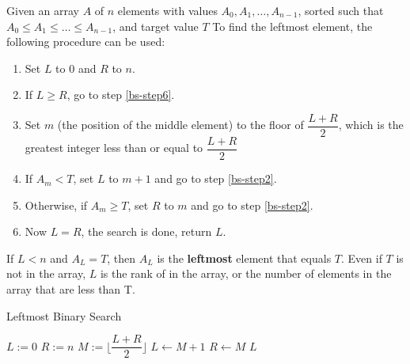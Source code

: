Given an array $A$ of $n$ elements with values $A_0, A_1, \ldots, A_{n-1}$, sorted such that $A_0 \leq A_1 \leq \ldots \leq A_{n-1}$, and target value $T$
To find the leftmost element, the following procedure can be used:
\begin{enumerate}
    \item Set $L$ to 0 and $R$ to $n$.
    \item If $L \geq R$, go to step \ref{bs-step6}. \label{bs-step2}
    \item Set $m$ (the position of the middle element) to the floor of $\dfrac{L + R}{2}$, which is the greatest integer less than or equal to $\dfrac{L + R}{2}$
    \item If $A_m < T$, set $L$ to $m + 1$ and go to step \ref{bs-step2}.
    \item Otherwise, if $A_m \geq T$, set $R$ to $m$ and go to step \ref{bs-step2}.
    \item Now $L = R$, the search is done, return $L$. \label{bs-step6}
\end{enumerate}
If $L < n$ and $A_L = T$, then $A_L$ is the \textbf{leftmost} element that equals $T$. Even if $T$ is not in the array, $L$ is the rank of in the array, or the number of elements in the array that are less than T.
\setcounter{algorithm}{0}
\begin{algorithm}[H]
\caption{Leftmost Binary Search}
\begin{algorithmic}[1]
\State $L := 0$
\State $R := n$
\State $M := \lfloor\dfrac{L+R}{2}\rfloor$
\State $L\gets M+1$
\Else
\State $R\gets M$
\EndIf
\EndWhile
\State \Return $L$
\EndFunction
\end{algorithmic}
\end{algorithm}

